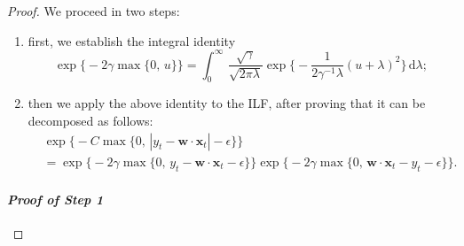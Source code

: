 \begin{proof}
We proceed in two steps:
\begin{enumerate}
	\item first, we establish the integral identity
	\begin{equation}
	\label{eq:henao-result}
		\exp\Big\{-2\gamma\max\big\{0,\, u\big\}\Big\}
		= \int_{0}^{\infty}\,\frac{\sqrt{\gamma}}{\sqrt{2\pi\lambda}}\exp\Big\{-\frac{1}{2\gamma^{-1}\lambda}(u+\lambda)^2\Big\}\,\mathrm{d}\lambda;
	\end{equation}
	\item then we apply the above identity to the ILF, after proving that it can be decomposed as follows:
\begin{align}
	& \exp\Big\{-C\max\big\{0,\, |y_t - \mathbf{w}\cdot\mathbf{x}_t| - \epsilon\big\}\Big\}
	\nonumber \\
	&= \exp\Big\{-2\gamma\max\big\{0,\, y_t - \mathbf{w}\cdot\mathbf{x}_t - \epsilon\big\}\Big\}
	\exp\Big\{-2\gamma\max\big\{0,\, \mathbf{w}\cdot\mathbf{x}_t - y_t - \epsilon\big\}\Big\}.
\end{align}
\end{enumerate}

\paragraph{\it{Proof of Step 1}}


\end{proof}
